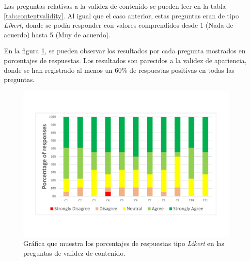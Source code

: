Las preguntas relativas a la validez de contenido se pueden leer en la tabla \ref{tab:contentvalidity}. Al igual que el caso anterior, estas preguntas eran de tipo \emph{Likert}, donde se podía responder con valores comprendidos desde 1 (Nada de acuerdo) hasta 5 (Muy de acuerdo).

En la figura \ref{fig:contentvalidity}, se pueden observar los resultados por cada pregunta mostrados en porcentajes de respuestas. Los resultados son parecidos a la validez de apariencia, donde se han registrado al menos un 60\% de respuestas positivas en todas las preguntas. 

\begin{figure}[hb]
    \centering
    \includegraphics[trim={15mm 25mm 15mm 25mm},clip,width=0.9\linewidth]{IMG/contentvalidty.pdf}
    \caption{Gráfica que muestra los porcentajes de respuestas tipo \emph{Likert} en las preguntas de validez de contenido.}
    \label{fig:contentvalidity}
\end{figure}




